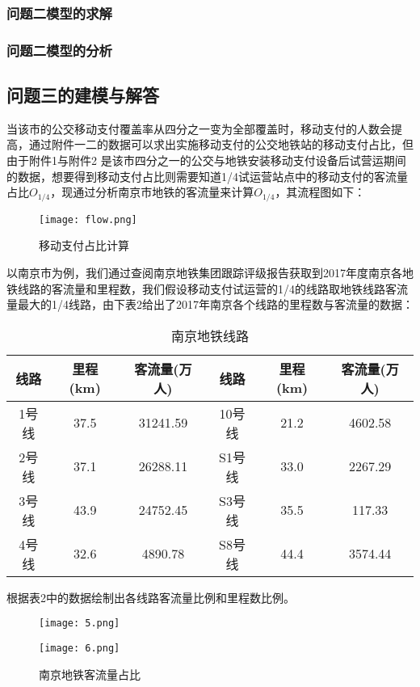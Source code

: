 \documentclass[withoutpreface,bwprint]{cumcmthesis} %
\begin{document}
\subsubsection{问题二模型的求解}
\subsubsection{问题二模型的分析}
\subsection{问题三的建模与解答}
当该市的公交移动支付覆盖率从四分之一变为全部覆盖时，移动支付的人数会提高，通过附件一二的数据可以求出实施移动支付的公交地铁站的移动支付占比，但由于附件1与附件2 是该市四分之一的公交与地铁安装移动支付设备后试营运期间的数据，想要得到移动支付占比则需要知道1/4试运营站点中的移动支付的客流量占比$O_{1/4}$，现通过分析南京市地铁的客流量来计算$O_{1/4}$，其流程图如下：

\begin{figure}[h]
\centering
\texttt{[image: flow.png]}
\caption{移动支付占比计算}
\end{figure}
以南京市为例，我们通过查阅南京地铁集团跟踪评级报告获取到2017年度南京各地铁线路的客流量和里程数，我们假设移动支付试运营的1/4的线路取地铁线路客流量最大的1/4线路，由下表2给出了2017年南京各个线路的里程数与客流量的数据：
\begin{center}
\makeatletter{}\makeatother
\begin{table}[h]
\centering
\caption{南京地铁线路}\label{tab:aStrangeTable}\centering%
\begin{tabular}{c|c|c|c|c|c}\hline
线路&里程(km)&客流量(万人)&线路&里程(km)&客流量(万人)\\\hline
1号线&37.5&31241.59&10号线&21.2&4602.58\\
2号线&37.1&26288.11&S1号线&33.0&2267.29\\
3号线&43.9&24752.45&S3号线&35.5&117.33\\
4号线&32.6&4890.78&S8号线&44.4&3574.44\\\hline
\end{tabular}
\end{table}
\end{center}

根据表2中的数据绘制出各线路客流量比例和里程数比例。
\begin{figure}[h]
\centering
\begin{minipage}[c]{0.4\textwidth}
\centering
\texttt{[image: 5.png]}
\end{minipage}
\begin{minipage}[c]{0.4\textwidth}
\centering
\texttt{[image: 6.png]}
\end{minipage}
\caption{南京地铁客流量占比}
\end{figure}
\end{document}
